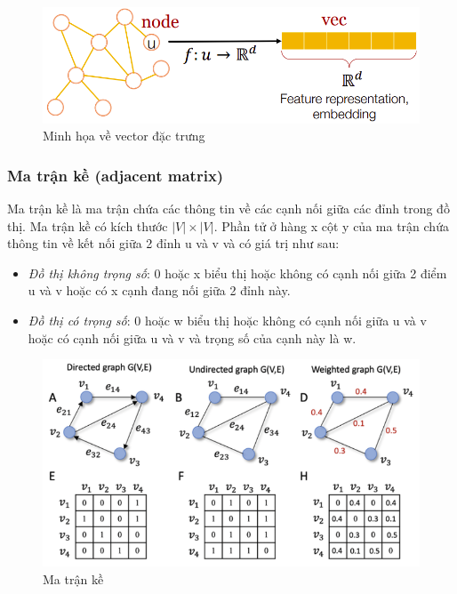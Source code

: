 \begin{figure}[H]
    \begin{center}
        \includegraphics[scale=0.5]{images/feature-vector}
        \caption{Minh họa về vector đặc trưng}
        \label{fig:feature-vector}
    \end{center}
\end{figure}


\subsubsection{Ma trận kề (adjacent matrix)}

Ma trận kề là ma trận chứa các thông tin về các cạnh nối giữa các đỉnh trong đồ thị. Ma trận kề có kích thước $|V| \times |V|$. Phần tử ở hàng x cột y của ma trận chứa thông tin về kết nối giữa 2 đỉnh u và v và có giá trị như sau:
\begin{itemize}
	\item \textit{Đồ thị không trọng số}: 0 hoặc x biểu thị hoặc không có cạnh nối giữa 2 điểm u và v hoặc có x cạnh đang nối giữa 2 đỉnh này.
	\item \textit{Đồ thị có trọng số}: 0 hoặc w biểu thị hoặc không có cạnh nối giữa u và v hoặc có cạnh nối giữa u và v và trọng số của cạnh này là w.
\end{itemize}

\begin{figure}[H]
    \begin{center}
        \includegraphics[scale=0.6]{images/adj-matrix}
        \caption{Ma trận kề}
        \label{fig:adj-matrix}
    \end{center}
\end{figure}


